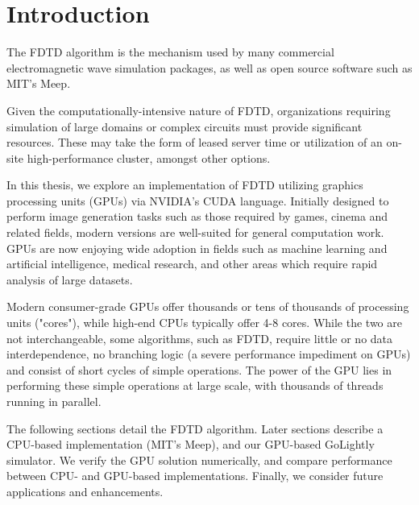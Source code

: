 
\chapter{Introduction} \label{ch:introduction}


%
%



The FDTD \cite{Yee} algorithm is the mechanism used by many commercial electromagnetic wave simulation packages, as well as open source software such as MIT's Meep\cite{OskooiRo10}. 

Given the computationally-intensive nature of FDTD, organizations requiring simulation of large domains or complex circuits must provide significant resources. These may take the form of leased server time or utilization of an on-site high-performance cluster, amongst other options.

In this thesis, we explore an implementation of FDTD utilizing graphics processing units (GPUs) via NVIDIA's CUDA\cite{cuda} language. Initially designed to perform image generation tasks such as those required by games, cinema and related fields, modern versions are well-suited for general computation work. GPUs are now enjoying wide adoption in fields such as machine learning\cite{Raina09largescaledeep} and artificial intelligence\cite{wu2009clustering}, medical research\cite{QIMS1079}, and other areas which require rapid analysis of large datasets.

Modern consumer-grade GPUs offer thousands or tens of thousands of processing units ("cores"), while high-end CPUs typically offer 4-8 cores. While the two are not interchangeable, some algorithms, such as FDTD, require little or no data interdependence, no branching logic (a severe performance impediment on GPUs) and consist of short cycles of simple operations. The power of the GPU lies in performing these simple operations at large scale, with thousands of threads running in parallel. 

The following sections detail the FDTD algorithm. Later sections describe a CPU-based implementation (MIT's  Meep), and our GPU-based GoLightly simulator. We verify the GPU solution numerically, and compare performance between CPU- and GPU-based implementations. Finally, we consider future applications and enhancements. 


